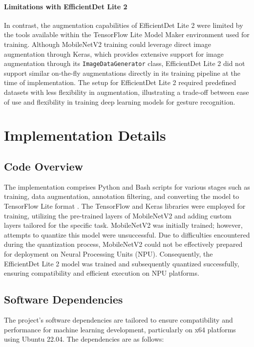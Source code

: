 \paragraph{Limitations with EfficientDet Lite 2}
In contrast, the augmentation capabilities of EfficientDet Lite 2 were limited by the tools available within the TensorFlow Lite Model Maker environment used for training. Although MobileNetV2 training could leverage direct image augmentation through Keras, which provides extensive support for image augmentation through its \texttt{ImageDataGenerator} class, EfficientDet Lite 2 did not support similar on-the-fly augmentations directly in its training pipeline at the time of implementation. The setup for EfficientDet Lite 2 required predefined datasets with less flexibility in augmentation, illustrating a trade-off between ease of use and flexibility in training deep learning models for gesture recognition.

\section{Implementation Details}
\subsection{Code Overview}
The implementation comprises Python and Bash scripts for various stages such as training, data augmentation, annotation filtering, and converting the model to TensorFlow Lite format \cite{gajdosik2024gesture}. The TensorFlow and Keras libraries were employed for training, utilizing the pre-trained layers of MobileNetV2 and adding custom layers tailored for the specific task. MobileNetV2 was initially trained; however, attempts to quantize this model were unsuccessful. Due to difficulties encountered during the quantization process, MobileNetV2 could not be effectively prepared for deployment on Neural Processing Units (NPU). Consequently, the EfficientDet Lite 2 model was trained and subsequently quantized successfully, ensuring compatibility and efficient execution on NPU platforms.

\subsection{Software Dependencies}
The project's software dependencies are tailored to ensure compatibility and performance for machine learning development, particularly on x64 platforms using Ubuntu 22.04. The dependencies are as follows:

